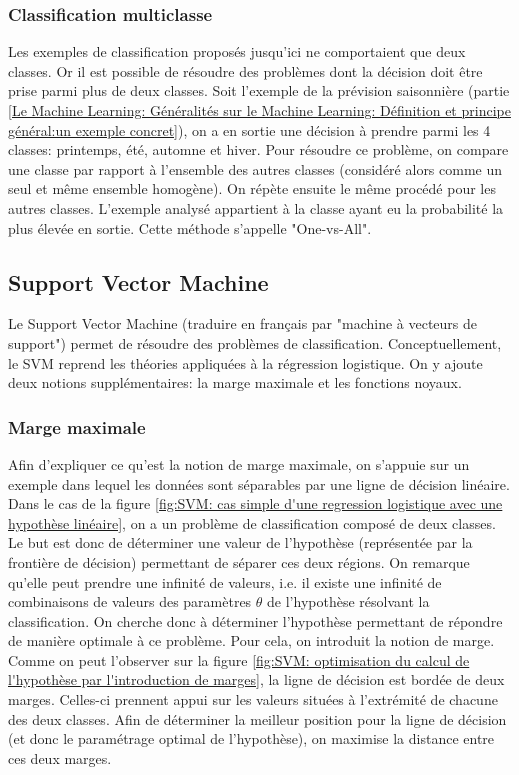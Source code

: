 \subsubsection{Classification multiclasse}
\label{Le Machine Learning: Les différents algorithmes: La regression logistique: La classification multi-classe}
Les exemples de classification proposés jusqu'ici ne comportaient que deux classes. Or il est possible de résoudre des problèmes dont la décision doit être prise parmi plus de deux classes. Soit l'exemple de la prévision saisonnière (partie \ref{Le Machine Learning: Généralités sur le Machine Learning: Définition et principe général:un exemple concret}), on a en sortie une décision à prendre parmi les 4 classes: printemps, été, automne et hiver. Pour résoudre ce problème, on compare une classe par rapport à l'ensemble des autres classes (considéré alors comme un seul et même ensemble homogène). On répète ensuite le même procédé pour les autres classes. L'exemple analysé appartient à la classe ayant eu la probabilité la plus élevée en sortie. Cette méthode s'appelle "One-vs-All".


\subsection{Support Vector Machine}
\label{Le Machine Learning: Les différents algorithmes: SVM}
Le Support Vector Machine (traduire en français par "machine à vecteurs de support") permet de résoudre des problèmes de classification. Conceptuellement, le SVM reprend les théories appliquées à la régression logistique. On y ajoute deux notions supplémentaires: la marge maximale et les fonctions noyaux.

\subsubsection{Marge maximale}
\label{Le Machine Learning: Les différents algorithmes: SVM: la marge maximale}
Afin d'expliquer ce qu'est la notion de marge maximale, on s'appuie sur un exemple dans lequel les données sont séparables par une ligne de décision linéaire. Dans le cas de la figure \ref{fig:SVM: cas simple d'une regression logistique avec une hypothèse linéaire}, on a un problème de classification composé de deux classes. Le but est donc de déterminer une valeur de l'hypothèse (représentée par la frontière de décision) permettant de séparer ces deux régions. On remarque qu'elle peut prendre une infinité de valeurs, i.e. il existe une infinité de combinaisons de valeurs des paramètres $\theta$ de l'hypothèse résolvant la classification. On cherche donc à déterminer l'hypothèse permettant de répondre de manière optimale à ce problème. Pour cela, on introduit la notion de marge. Comme on peut l'observer sur la figure \ref{fig:SVM: optimisation du calcul de l'hypothèse par l'introduction de marges}, la ligne de décision est bordée de deux marges. Celles-ci prennent appui sur les valeurs situées à l'extrémité de chacune des deux classes. Afin de déterminer la meilleur position pour la ligne de décision (et donc le paramétrage optimal de l'hypothèse), on maximise la distance entre ces deux marges. 

